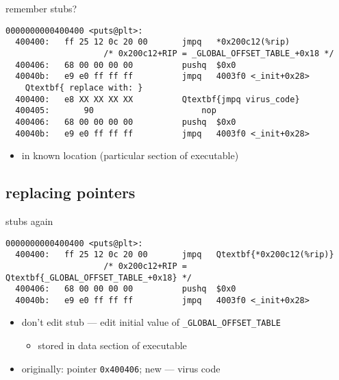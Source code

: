 \begin{frame}[fragile,label=stubReplace]{remember stubs?}
\begin{Verbatim}[commandchars=Q\{\},fontsize=\fontsize{8}{9}\selectfont]
0000000000400400 <puts@plt>:
  400400:	ff 25 12 0c 20 00    	jmpq   *0x200c12(%rip) 
                    /* 0x200c12+RIP = _GLOBAL_OFFSET_TABLE_+0x18 */
  400406:	68 00 00 00 00       	pushq  $0x0
  40040b:	e9 e0 ff ff ff       	jmpq   4003f0 <_init+0x28>
    Qtextbf{ replace with: }
  400400:	e8 XX XX XX XX          Qtextbf{jmpq virus_code}
  400405:       90                      nop
  400406:	68 00 00 00 00       	pushq  $0x0
  40040b:	e9 e0 ff ff ff       	jmpq   4003f0 <_init+0x28>
\end{Verbatim}
\begin{itemize}
    \item in known location (particular section of executable)
\end{itemize}
\end{frame}


\subsection{replacing pointers}


\begin{frame}[fragile,label=stubsReplacePtr]{stubs again}
\begin{Verbatim}[commandchars=Q\{\},fontsize=\fontsize{8}{9}\selectfont]
0000000000400400 <puts@plt>:
  400400:	ff 25 12 0c 20 00    	jmpq   Qtextbf{*0x200c12(%rip)}
                    /* 0x200c12+RIP = Qtextbf{_GLOBAL_OFFSET_TABLE_+0x18} */
  400406:	68 00 00 00 00       	pushq  $0x0
  40040b:	e9 e0 ff ff ff       	jmpq   4003f0 <_init+0x28>
\end{Verbatim}
\begin{itemize}
\item don't edit stub --- edit initial value of {\tt \_GLOBAL\_OFFSET\_TABLE}
    \begin{itemize}
    \item stored in data section of executable
    \end{itemize}
\item originally: pointer {\tt 0x400406}; new --- virus code
\end{itemize}
\end{frame}

